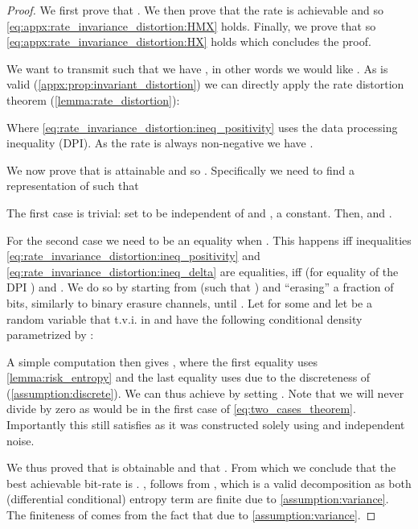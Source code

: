 \documentclass[final]{article}
\begin{document}
\begin{proof}
We first prove that .
We then prove that the rate  is achievable and so \cref{eq:appx:rate_invariance_distortion:HMX} holds.
Finally, we prove that  so \cref{eq:appx:rate_invariance_distortion:HX} holds which concludes the proof.

We want to transmit  such that  we have , in other words we would like .
As \disttextinv{} is valid (\cref{appx:prop:invariant_distortion}) we can directly apply the rate distortion theorem (\cref{lemma:rate_distortion}):


Where \cref{eq:rate_invariance_distortion:ineq_positivity} uses the data processing inequality (DPI). 
As the rate is always non-negative we have  .

We now prove that  is attainable and so .
Specifically we need to find a representation  of  such that 

The first case is trivial: set  to be independent of  and , \eg a constant.
Then,  and .

For the second case we need  to be an equality when . 
This happens iff  inequalities \cref{eq:rate_invariance_distortion:ineq_positivity} and \cref{eq:rate_invariance_distortion:ineq_delta} are equalities, \ie iff 
 (for equality of the DPI \cite{cover_elements_2006}) and
.
We do so by starting from  (such that ) and ``erasing'' a fraction  of bits, similarly to binary erasure channels, until .
Let  for some  and let  be a random variable that t.v.i. in  and have the following conditional density parametrized by :

A simple computation then gives , where the first equality uses \cref{lemma:risk_entropy} and the last equality uses  due to the discreteness of  (\cref{assumption:discrete}).
We can thus achieve  by setting .
Note that we will never divide by zero as  would be in the first case of \cref{eq:two_cases_theorem}. 
Importantly this  still satisfies  as it was constructed solely using  and independent noise.

We thus proved that  is obtainable and that .
From which we conclude that the best achievable bit-rate is .
, follows from , which is a valid decomposition as both (differential conditional) entropy term are finite due to \cref{assumption:variance}.
The finiteness of  comes from the  fact that  due to \cref{assumption:variance}.
\end{proof}
\end{document}
